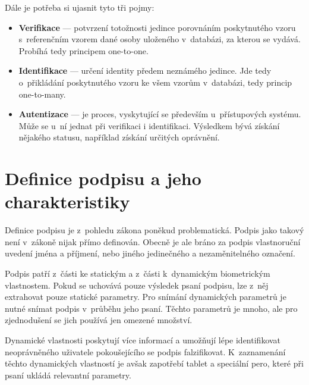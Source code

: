 Dále je potřeba si ujasnit tyto tři pojmy:
\begin{itemize}
  \item \textbf{Verifikace} --- potvrzení totožnosti jedince porovnáním poskytnutého vzoru s~referenčním vzorem dané osoby uloženého v~databázi, %
  za kterou se vydává. Probíhá tedy principem one-to-one.                                                                                     %
  \item \textbf{Identifikace} --- určení identity předem neznámého jedince.                                                                       %
  Jde tedy o~přikládání poskytnutého vzoru ke všem vzorům v~databázi, tedy princip one-to-many.                                                %
  \item \textbf{Autentizace} --- je proces, vyskytující se především u~přístupových systému.                                                      %
  Může se u~ní jednat při verifikaci i identifikaci.                                                                                            %
  Výsledkem bývá získání nějakého statusu, například získání určitých oprávnění.~\cite{Scurek2015}                                                        %
\end{itemize}


\section{Definice podpisu a jeho charakteristiky}
Definice podpisu je z~pohledu zákona poněkud problematická. 
Podpis jako takový není v~zákoně nijak přímo definován. 
Obecně je ale bráno za podpis vlastnoruční uvedení jména a příjmení, nebo jiného jedinečného a nezaměnitelného označení.~\cite{Fulsoft2023} %

Podpis patří z~části ke statickým a z~části k~dynamickým biometrickým vlastnostem.
Pokud se uchovává pouze výsledek psaní podpisu, lze z~něj extrahovat pouze statické parametry.
Pro snímání dynamických parametrů je nutné snímat podpis v~průběhu jeho psaní.
Těchto parametrů je mnoho, ale pro zjednodušení se jich používá jen omezené množství.

Dynamické vlastnosti poskytují více informací a umožňují lépe identifikovat neoprávněného uživatele pokoušejícího se podpis falzifikovat.    %
K~zaznamenání těchto dynamických vlastností je avšak zapotřebí tablet a speciální pero, které při psaní ukládá relevantní parametry.~\cite{DrahanskýMartin2011}  %

